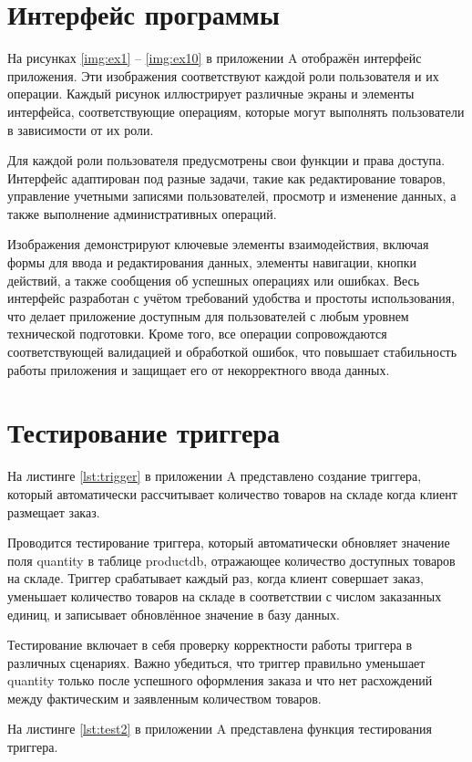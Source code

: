 \section{Интерфейс программы}

На рисунках \ref{img:ex1} -- \ref{img:ex10} в приложении A отображён интерфейс приложения. Эти изображения соответствуют каждой роли пользователя и их операции.
Каждый рисунок иллюстрирует различные экраны и элементы интерфейса, соответствующие операциям, которые могут выполнять пользователи в зависимости от их роли.

Для каждой роли пользователя предусмотрены свои функции и права доступа. Интерфейс адаптирован под разные задачи, такие как редактирование товаров, управление учетными записями пользователей, просмотр и изменение данных, а также выполнение административных операций.

Изображения демонстрируют ключевые элементы взаимодействия, включая формы для ввода и редактирования данных, элементы навигации, кнопки действий, а также сообщения об успешных операциях или ошибках. Весь интерфейс разработан с учётом требований удобства и простоты использования, что делает приложение доступным для пользователей с любым уровнем технической подготовки. Кроме того, все операции сопровождаются соответствующей валидацией и обработкой ошибок, что повышает стабильность работы приложения и защищает его от некорректного ввода данных.

\section{Тестирование триггера}
На листинге \ref{lst:trigger} в приложении A представлено создание триггера, который автоматически рассчитывает количество товаров на складе когда клиент размещает заказ.

Проводится тестирование триггера, который автоматически обновляет значение поля quantity в таблице productdb, отражающее количество доступных товаров на складе. Триггер срабатывает каждый раз, когда клиент совершает заказ, уменьшает количество товаров на складе в соответствии с числом заказанных единиц, и записывает обновлённое значение в базу данных.

Тестирование включает в себя проверку корректности работы триггера в различных сценариях. Важно убедиться, что триггер правильно уменьшает quantity только после успешного оформления заказа и что нет расхождений между фактическим и заявленным количеством товаров.

На листинге \ref{lst:test2} в приложении A представлена функция тестирования триггера.

